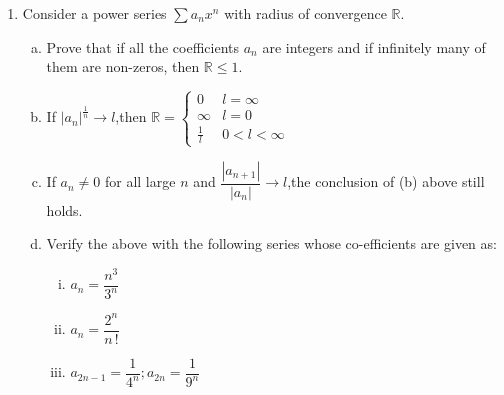 \documentclass[journal,12pt,twocolumn]{IEEEtran}
\begin{document}
\begin{enumerate}
\begin{enumerate}[(i)]
\end{enumerate}

\item Consider a power series $\sum\nolimits {a_n}x^n$ with radius of convergence $\mathbb{R}$.

\setlength\itemsep{2em}
\begin{enumerate}[(a)]

\item Prove that if all the coefficients $a_{n}$ are integers and if infinitely many of them are non-zeros, then $\mathbb{R}\leqslant1 $.	

\item If $|{a_n}|^ {\frac{1}{n}} \rightarrow l$,then 
$
\mathbb{R} = 
\begin{cases} 0 &   l = \infty 
\\ 
\infty&    l = 0 
\\ 
\frac{1}{l}&  0 < l < \infty
\end{cases} 
$

\item If ${a_n}\neq0$ for all large $n$ and $ {\dfrac{|{a_{n+1}}|}{|{a_n}|}} \rightarrow l$,the conclusion of (b) above still holds.

\item Verify the above with the following series whose co-efficients are given as:

\begin{enumerate}[(i)]

\item $a_{n} = \dfrac{n^3}{3^n} $
\item $a_{n} = \dfrac{2^n}{n\,!}$
\item $a_{2n-1} = \dfrac{1}{4^n}; a_{2n} = \dfrac{1}{9^n}$



\end{enumerate}
\end{enumerate}
\end{enumerate}
\end{document}
